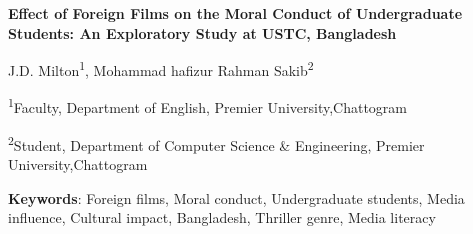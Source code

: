 \documentclass[12pt]{article}
\begin{document}
\begin{titlepage}
  \centering
  \vspace*{1cm}
  {\LARGE\bfseries Effect of Foreign Films on the Moral Conduct of Undergraduate Students: An Exploratory Study at USTC, Bangladesh \par}
  \vspace{1cm}
{\large J.D. Milton\textsuperscript{1}, Mohammad hafizur Rahman Sakib\textsuperscript{2} \par}
\vspace{0.5cm}
{\normalsize
  \textsuperscript{1}Faculty, Department of English, Premier University,Chattogram \par
  \textsuperscript{2}Student, Department of Computer Science \& Engineering, Premier University,Chattogram \par
}
  \vspace{2cm}
\begin{abstract}
\fontsize{12.5pt}{15pt}\selectfont
This study explores the influence of foreign films on the moral and behavioral conduct of first-year undergraduate students in the Department of English at the University of Science and Technology Chittagong (USTC), Bangladesh. Using a mixed-method approach, data were collected from 20 students through a questionnaire with five quantitative multiple-choice questions and two qualitative opinion-based questions. Findings show high engagement with foreign films, particularly Hollywood (85\%) and Bollywood (65\%), with thrillers (50\%) and comedies (45\%) as top genres. Students are drawn to compelling stories (45\% first priority), themes, and characters, with 55\% viewing films as societal reflections. Benefits include cultural exposure and analytical skills, but risks involve moral desensitization, cultural erosion, and academic distraction. Recommendations advocate regulated viewing, media literacy, and a stronger local film industry to preserve Bangladeshi values. This research underscores the need for critical media consumption among youth.
\end{abstract}


  \vspace{0.5cm}
  {\normalsize \textbf{Keywords}: Foreign films, Moral conduct, Undergraduate students, Media influence, Cultural impact, Bangladesh, Thriller genre, Media literacy \par}
\end{titlepage}

\tableofcontents
\newpage
\end{document}
